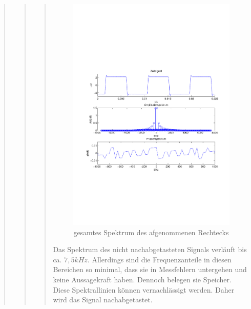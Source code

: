 \begin{quote}
\begin{quote}
\begin{quote}
            \begin{figure}[H]
            \centering
                \includegraphics[scale=0.7, trim = 1.5cm 6.5cm 1cm 7.5cm,
                clip]{./Bilder/rechteck_100Hz_15kHz_keine_frequenzbegrenzung.pdf}
                    \caption{gesamtes Spektrum des afgenommenen Rechtecks}
            \end{figure}
        
            Das Spektrum des nicht nachabgetasteten Signals verläuft bis ca. $7,5kHz$. Allerdings sind die
            Frequenzanteile in diesen Bereichen so minimal, dass sie in Messfehlern untergehen und keine Aussagekraft haben. Dennoch belegen sie Speicher.\\
            Diese Spektrallinien können vernachlässigt werden. Daher wird das Signal nachabgetastet.
            

\end{quote}
\end{quote}
\end{quote}
